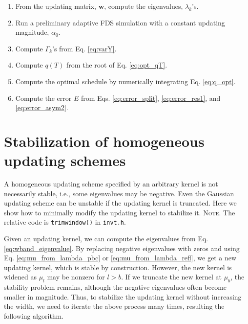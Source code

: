 \documentclass[reprint, floatfix]{revtex4-1}
\newcommand{\note}[1]{{\color{DarkGreen}\footnotesize \textsc{Note.} #1}}
\begin{document}
\begin{enumerate}

\item
From the updating matrix, $\mathbf w$,
compute the eigenvalues, $\lambda_k$'s.

\item
Run a preliminary adaptive FDS simulation
with a constant updating magnitude, $\alpha_0$.

\item
Compute $\Gamma_k$'s from Eq. \eqref{eq:varY}.

\item
Compute $q(T)$ from the root of Eq. \eqref{eq:opt_qT}.

\item
Compute the optimal schedule by
numerically integrating Eq. \eqref{eq:q_opt}.

\item
Compute the error $E$ from
Eqs. \eqref{eq:error_split},
  \eqref{eq:error_res1},
  and
  \eqref{eq:error_asym2}.

\end{enumerate}







\section{\label{sec:stabilize_wband}
Stabilization of homogeneous updating schemes}



%
A homogeneous updating scheme
specified by an arbitrary kernel
is not necessarily stable,
i.e., some eigenvalues may be negative.
%
%
  Even
  the Gaussian updating scheme can be unstable
  if the updating kernel is truncated.
%
Here we show how to minimally modify
the updating kernel
to stabilize it.
%
\note{The relative code is \texttt{trimwindow()} in \texttt{invt.h}.
}


Given an updating kernel,
we can compute the eigenvalues from
Eq. \eqref{eq:wband_eigenvalue}.
%
By replacing negative eigenvalues with zeros and
using Eq. \eqref{eq:mu_from_lambda_pbc}
or \eqref{eq:mu_from_lambda_refl},
we get a new updating kernel,
which is stable by construction.
%
However, the new kernel is widened
as $\mu_l$ may be nonzero for $l > b$.
%
If we truncate the new kernel at $\mu_b$,
the stability problem remains,
although the negative eigenvalues
often become smaller in magnitude.
%
Thus, to stabilize the updating kernel
without increasing the width,
we need to iterate the above process many times,
resulting the following algorithm.
\end{document}
